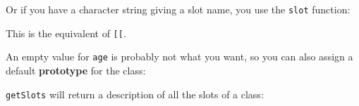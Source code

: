 \begin{Shaded}
\begin{Highlighting}[]
\StringTok{ }\NormalTok{(}\NormalTok{, } \NormalTok{)}
\end{Highlighting}
\end{Shaded}

Or if you have a character string giving a slot name, you use the
\texttt{slot} function:

\begin{Shaded}
\begin{Highlighting}[]
\NormalTok{)}
\end{Highlighting}
\end{Shaded}

This is the equivalent of \texttt{{[}{[}}.

An empty value for \texttt{age} is probably not what you want, so you
can also assign a default \textbf{prototype} for the class:

\begin{Shaded}
\begin{Highlighting}[]
\NormalTok{(}\NormalTok{, }\NormalTok{(} \NormalTok{, } \NormalTok{), }
  \NormalTok{(} \NormalTok{, } \NormalTok{))}
\StringTok{ }\NormalTok{(}\NormalTok{, } \NormalTok{)}
\end{Highlighting}
\end{Shaded}

\texttt{getSlots} will return a description of all the slots of a class:

\begin{Shaded}
\begin{Highlighting}[]
\NormalTok{(}\NormalTok{)}
\end{Highlighting}
\end{Shaded}

